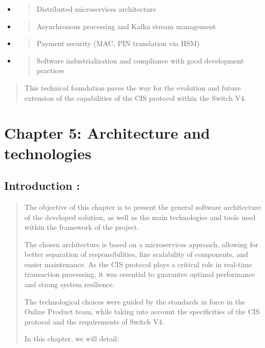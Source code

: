 \documentclass[12pt,a4paper]{report}
\begin{document}
\begin{itemize}
\item
  \begin{quote}
  Distributed microservices architecture
  \end{quote}
\item
  \begin{quote}
  Asynchronous processing and Kafka stream management
  \end{quote}
\item
  \begin{quote}
  Payment security (MAC, PIN translation via HSM)
  \end{quote}
\item
  \begin{quote}
  Software industrialization and compliance with good development
  practices
  \end{quote}
\end{itemize}

\begin{quote}
This technical foundation paves the way for the evolution and future
extension of the capabilities of the CIS protocol within the Switch V4.
\end{quote}
\clearpage


\section{Chapter 5: Architecture and technologies
}


\subsection{Introduction :}

\begin{quote}
The objective of this chapter is to present the general software
architecture of the developed solution, as well as the main technologies
and tools used within the framework of the project.

The chosen architecture is based on a microservices approach, allowing
for better separation of responsibilities, fine scalability of
components, and easier maintenance. As the CIS protocol plays a critical
role in real-time transaction processing, it was essential to guarantee
optimal performance and strong system resilience.

The technological choices were guided by the standards in force in the
Online Product team, while taking into account the specificities of the
CIS protocol and the requirements of Switch V4.

In this chapter, we will detail:
\end{quote}
\end{document}
